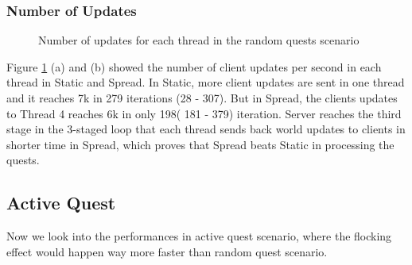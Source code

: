 \documentclass[12pt,a4paper]{article} %
\theoremstyle{definition}
\theoremstyle{remark}
\begin{document}
\subsubsection {Number of Updates} 
\begin{figure}[!ht]
	\hfill
	\caption{Number of updates for each thread in the random quests scenario}
	\label{updates_random}
\end{figure}
Figure \ref{updates_random} (a) and (b) showed the number of client updates per second in each thread in Static and Spread. 
In Static, more client updates are sent in one thread and it reaches 7k in 279 iterations (28 - 307). But in Spread, the clients
updates to Thread 4 reaches 6k in only 198( 181 - 379) iteration. Server reaches the third stage in the 3-staged loop
that each thread sends back world updates to clients in shorter time in Spread, which proves that Spread
beats Static in processing the quests.



\subsection{Active Quest}
Now we look into the performances in active quest scenario, where the flocking effect would happen way more faster than random quest scenario.
\end{document}
